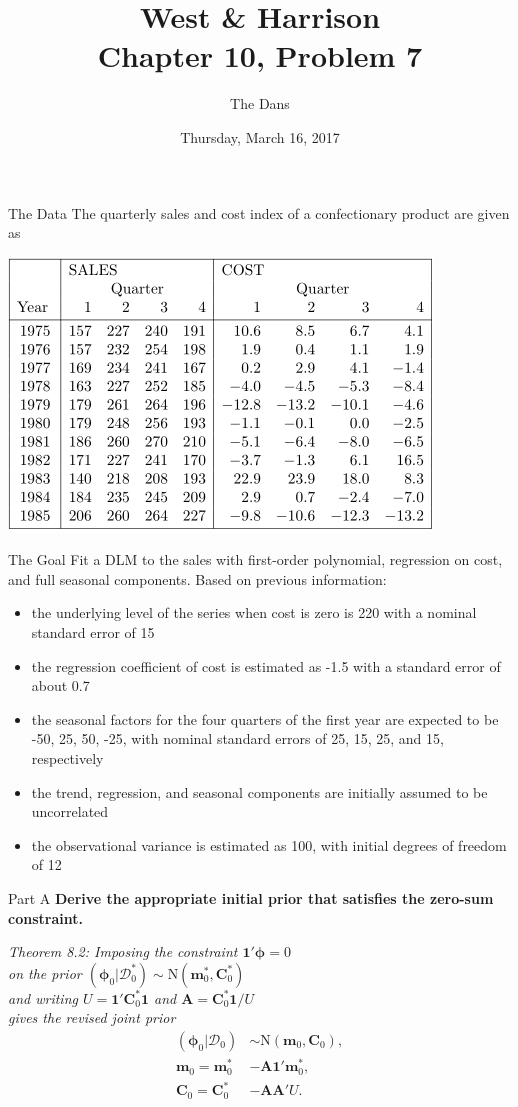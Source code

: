 \documentclass[14pt]{beamer}
\title{West \& Harrison \\ Chapter 10, Problem 7}
\author{The Dans}
\date{Thursday, March 16, 2017}
\newcommand{\bone}{\mathbf{1}}
\newcommand{\bphi}{\boldsymbol{\phi}}
\newcommand{\sD}{\mathcal{D}}
\newcommand{\bm}{\mathbf{m}}
\newcommand{\bC}{\mathbf{C}}
\newcommand{\bA}{\mathbf{A}}
\begin{document}
	\maketitle
	
	\begin{frame}{The Data}
		The quarterly sales and cost index of a confectionary product are given as
		\begin{center}
			\includegraphics[width=0.5\linewidth]{Data}
		\end{center}
	\end{frame}

	\begin{frame}{The Goal}
		Fit a DLM to the sales with first-order polynomial, regression on cost, and full seasonal components. Based on previous information:
		{\footnotesize \begin{itemize}
			\item the underlying level of the series when cost is zero is 220 with a nominal standard error of 15
			\item the regression coefficient of cost is estimated as -1.5 with a standard error of about 0.7
			\item the seasonal factors for the four quarters of the first year are expected to be -50, 25, 50, -25, with nominal standard errors of 25, 15, 25, and 15, respectively
			\item the trend, regression, and seasonal components are initially assumed to be uncorrelated
			\item the observational variance is estimated as 100, with initial degrees of freedom of 12
		\end{itemize}}
	\end{frame}
	
	\begin{frame}{Part A}
		\textbf{Derive the appropriate initial prior that satisfies the zero-sum constraint.}
		
			\textit{Theorem 8.2: Imposing the constraint $\bone'\bphi = 0$ \\ on the prior $(\bphi_0|\sD_0^*) \sim \text{N}(\bm_0^*,\bC_0^*)$ \\ and writing $U = \bone'\bC_0^*\bone$ and $\bA = \bC_0^*\bone/U$ \\ gives the revised joint prior}	
		\begin{align*}
		(\bphi_0|\sD_0) & \sim \text{N}(\bm_0,\bC_0),\\
		\bm_0 = \bm_0^* & - \bA\bone'\bm_0^*,\\
		\bC_0 = \bC_0^* & - \bA\bA'U.
		\end{align*} 
	\end{frame}
	
\end{document}
